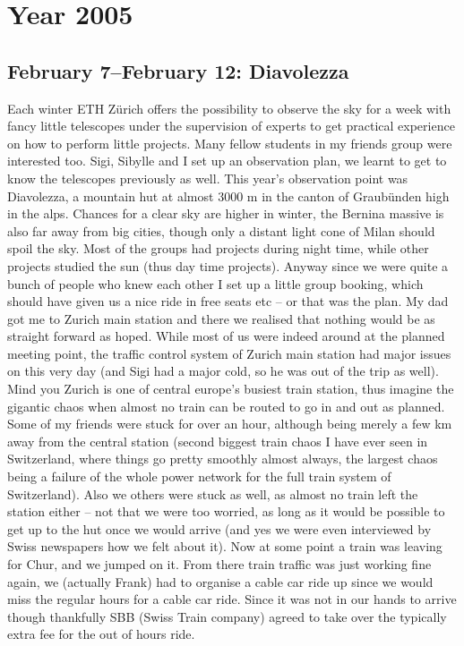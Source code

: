 \chapter{Year 2005}
\label{2005}

\section{February 7--February 12: Diavolezza}
\label{2005:Diavolezza}

Each winter ETH Z\"urich offers the possibility to observe the sky for a week with fancy little telescopes under the supervision of experts to get practical experience on how to perform little projects. Many fellow students in my friends group were interested too. Sigi, Sibylle and I set up an observation plan, we learnt to get to know the telescopes previously as well. This year's observation point was Diavolezza, a mountain hut at almost 3000 m in the canton of Graub\"unden high in the alps. Chances for a clear sky are higher in winter, the Bernina massive is also far away from big cities, though only a distant light cone of Milan should spoil the sky. Most of the groups had projects during night time, while other projects studied the sun (thus day time projects). Anyway since we were quite a bunch of people who knew each other I set up a little group booking, which should have given us a nice ride in free seats etc -- or that was the plan. My dad got me to Zurich main station and there we realised that nothing would be as straight forward as hoped. While most of us were indeed around at the planned meeting point, the traffic control system of Zurich main station had major issues on this very day (and Sigi had a major cold, so he was out of the trip as well). Mind you Zurich is one of central europe's busiest train station, thus imagine the gigantic chaos when almost no train can be routed to go in and out as planned. Some of my friends were stuck for over an hour, although being merely a few km away from the central station (second biggest train chaos I have ever seen in Switzerland, where things go pretty smoothly almost always, the largest chaos being a failure of the whole power network for the full train system of Switzerland). Also we others were stuck as well, as almost no train left the station either -- not that we were too worried, as long as it would be possible to get up to the hut once we would arrive (and yes we were even interviewed by Swiss newspapers how we felt about it). Now at some point a train was leaving for Chur, and we jumped on it. From there train traffic was just working fine again, we (actually Frank) had to organise a cable car ride up since we would miss the regular hours for a cable car ride. Since it was not in our hands to arrive though thankfully SBB (Swiss Train company) agreed to take over the typically extra fee for the out of hours ride.\\
